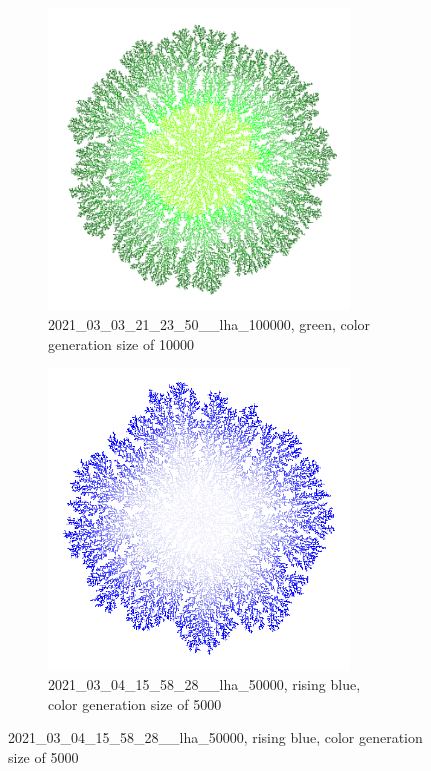 \documentclass[12pt,a4paper]{scrartcl}
\newcommand{\1}{\mathbbm{1}}
\theoremstyle{definition}
\numberwithin{equation}{section}
\begin{document}
\begin{figure}[h!]
	\centering
	\begin{subfigure}[b]{.49\textwidth}
		\centerline{\includegraphics[height=8cm]{images/ia/2021_03_03_21_23_50___100000__10000__8923.png}}
		\captionsetup{labelformat=empty}
		\caption{2021\_03\_03\_21\_23\_50\_\_lha\_100000, green, color generation size of 10000}
	\end{subfigure}
	\begin{subfigure}[b]{.49\textwidth}
		\centerline{\includegraphics[height=8cm]{images/ia/2021_03_04_15_58_28___50000__5000__5250.png}}
		\captionsetup{labelformat=empty}
		\caption{2021\_03\_04\_15\_58\_28\_\_lha\_50000, rising blue, color generation size of 5000}
	\end{subfigure}
\end{figure}

\vspace*{\fill}
\end{document}

